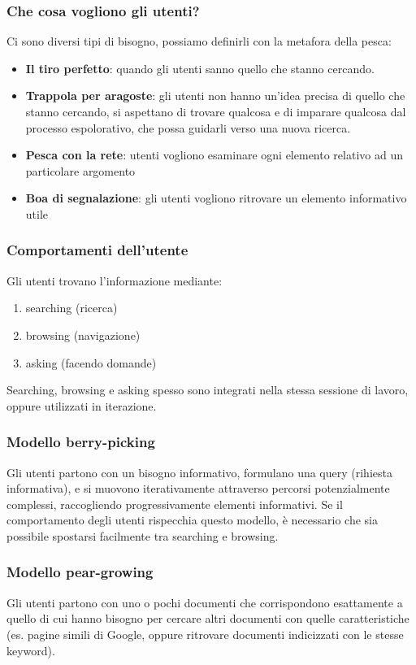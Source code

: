 \documentclass{article}
\begin{document}
\subsubsection{Che cosa vogliono gli utenti?}
Ci sono diversi tipi di bisogno, possiamo definirli con la metafora della pesca:
\begin{itemize}
\item \textbf{Il tiro perfetto}: quando gli utenti sanno quello che stanno cercando.
\item \textbf{Trappola per aragoste}: gli utenti non hanno un'idea precisa di quello che stanno cercando, si aspettano di trovare qualcosa e di imparare qualcosa dal processo espolorativo, che possa guidarli verso una nuova ricerca.
\item \textbf{Pesca con la rete}: utenti vogliono esaminare ogni elemento relativo ad un particolare argomento
\item \textbf{Boa di segnalazione}: gli utenti vogliono ritrovare un elemento informativo utile
\end{itemize}
\subsubsection{Comportamenti dell'utente}
Gli utenti trovano l'informazione mediante:
\begin{enumerate}
\item searching (ricerca)
\item browsing (navigazione)
\item asking (facendo domande)
\end{enumerate}
Searching, browsing e asking spesso sono integrati nella stessa sessione di lavoro, oppure utilizzati in iterazione.
\subsubsection{Modello berry-picking}
Gli utenti partono con un bisogno informativo, formulano una query (rihiesta informativa), e si muovono iterativamente attraverso percorsi potenzialmente complessi, raccogliendo progressivamente elementi informativi. Se il comportamento degli utenti rispecchia questo modello, è necessario che sia possibile spostarsi facilmente tra searching e browsing.
\subsubsection{Modello pear-growing}
Gli utenti partono con uno o pochi documenti che corrispondono esattamente a quello di cui hanno bisogno per cercare altri documenti con quelle caratteristiche (es. pagine simili di Google, oppure ritrovare documenti indicizzati con le stesse keyword).
\end{document}
